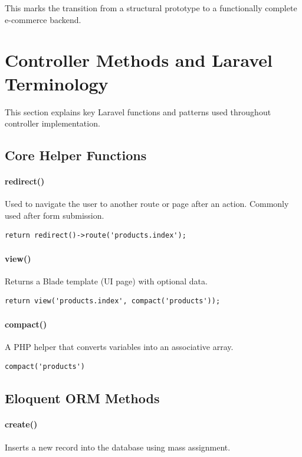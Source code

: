 \documentclass[12pt,a4paper]{article}
\begin{document}
This marks the transition from a structural prototype to a functionally complete e-commerce backend.
\section{Controller Methods and Laravel Terminology}

This section explains key Laravel functions and patterns used throughout controller implementation.

\subsection{Core Helper Functions}

\paragraph{redirect()}
Used to navigate the user to another route or page after an action.
Commonly used after form submission.

\begin{verbatim}
return redirect()->route('products.index');
\end{verbatim}

\paragraph{view()}
Returns a Blade template (UI page) with optional data.

\begin{verbatim}
return view('products.index', compact('products'));
\end{verbatim}

\paragraph{compact()}
A PHP helper that converts variables into an associative array.

\begin{verbatim}
compact('products')
\end{verbatim}

\subsection{Eloquent ORM Methods}

\paragraph{create()}
Inserts a new record into the database using mass assignment.
\end{document}
